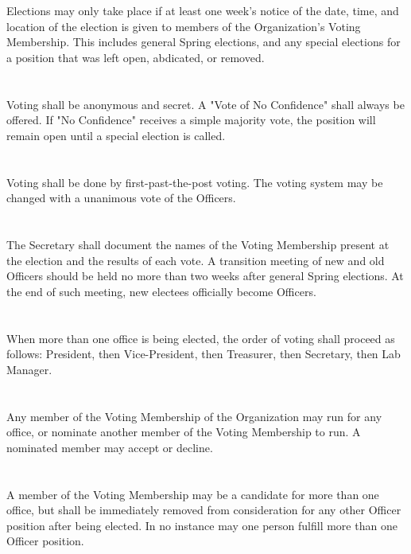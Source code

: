 \documentclass[12pt]{cls/constitution}
\begin{document}
\section{}
Elections may only take place if at least one week’s notice of the date, time, and location of the election is given to members of the Organization's Voting Membership. This includes general Spring elections, and any special elections for a position that was left open, abdicated, or removed.

\section{}
Voting shall be anonymous and secret. A "Vote of No Confidence" shall always be offered. If "No Confidence" receives a simple majority vote, the position will remain open until a special election is called.

\section{}
Voting shall be done by first-past-the-post voting. The voting system may be changed with a unanimous vote of the Officers.

\section{}
The Secretary shall document the names of the Voting Membership present at the election and the results of each vote. A transition meeting of new and old Officers should be held no more than two weeks after general Spring elections. At the end of such meeting, new electees officially become Officers.

\section{}
When more than one office is being elected, the order of voting shall proceed as follows: President, then Vice-President, then Treasurer, then Secretary, then Lab Manager.

\section{}
Any member of the Voting Membership of the Organization may run for any office, or nominate another member of the Voting Membership to run. A nominated member may accept or decline.

\section{}
A member of the Voting Membership may be a candidate for more than one office, but shall be immediately removed from consideration for any other Officer position after being elected. In no instance may one person fulfill more than one Officer position. 
\end{document}

